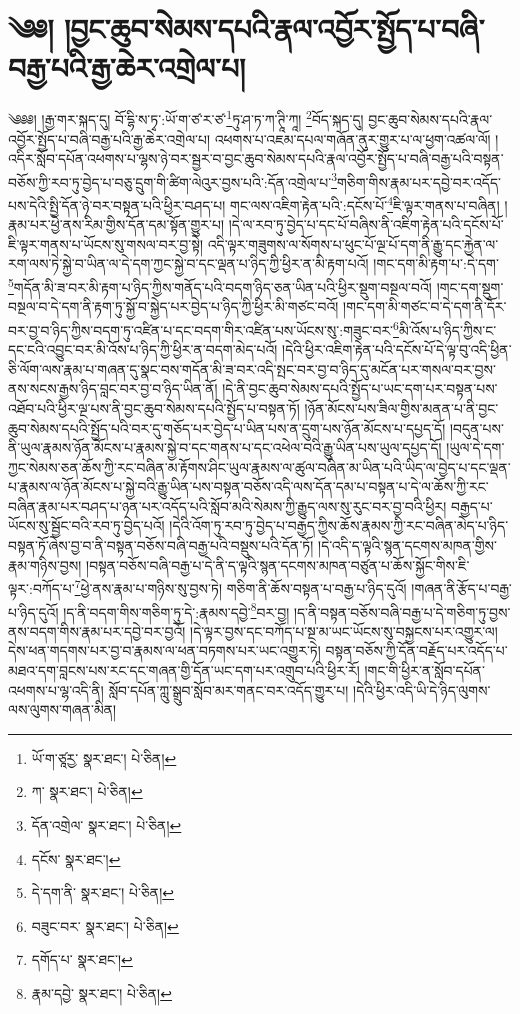 \setcounter{footnote}{0} 
\chapter{༄༅། །བྱང་ཆུབ་སེམས་དཔའི་རྣལ་འབྱོར་སྤྱོད་པ་བཞི་བརྒྱ་པའི་རྒྱ་ཆེར་འགྲེལ་པ།}༄༅༅། །རྒྱ་གར་སྐད་དུ། བོ་དྷི་ས་ཏྭ་:ཡོ་ག་ཙ་ར་ཙ་\footnote{ཡོ་ག་ཙཱརྱ་  སྣར་ཐང་།  པེ་ཅིན། }ཏུ་ཤ་ཏ་ཀ་ཊཱི་ཀཱ། \footnote{ཀ་  སྣར་ཐང་།  པེ་ཅིན། }བོད་སྐད་དུ། བྱང་ཆུབ་སེམས་དཔའི་རྣལ་འབྱོར་སྤྱོད་པ་བཞི་བརྒྱ་པའི་རྒྱ་ཆེར་འགྲེལ་པ། འཕགས་པ་འཇམ་དཔལ་གཞོན་ནུར་གྱུར་པ་ལ་ཕྱག་འཚལ་ལོ། །འདིར་སློབ་དཔོན་འཕགས་པ་ལྷས་ཉེ་བར་སྦྱར་བ་བྱང་ཆུབ་སེམས་དཔའི་རྣལ་འབྱོར་སྤྱོད་པ་བཞི་བརྒྱ་པའི་བསྟན་བཅོས་ཀྱི་རབ་ཏུ་བྱེད་པ་བཅུ་དྲུག་གི་ཚིག་ལེའུར་བྱས་པའི་:དོན་འགྲེལ་པ་\footnote{དོན་འགྲེལ་  སྣར་ཐང་།  པེ་ཅིན། }གཅིག་གིས་རྣམ་པར་དབྱེ་བར་འདོད་པས་དེའི་སྤྱི་དོན་ཉེ་བར་བསྟན་པའི་ཕྱིར་བཤད་པ། གང་ལས་འཇིག་རྟེན་པའི་:དངོས་པོ་\footnote{དངོས་  སྣར་ཐང་། }ཇི་ལྟར་གནས་པ་བཞིན། །རྣམ་པར་ཕྱེ་ནས་རིམ་གྱིས་དོན་དམ་སྟོན་གྱུར་པ། །དེ་ལ་རབ་ཏུ་བྱེད་པ་དང་པོ་བཞིས་ནི་འཇིག་རྟེན་པའི་དངོས་པོ་ཇི་ལྟར་གནས་པ་ཡོངས་སུ་གསལ་བར་བྱ་སྟེ། འདི་ལྟར་གཟུགས་ལ་སོགས་པ་ཕུང་པོ་ལྔ་པོ་དག་ནི་རྒྱུ་དང་རྐྱེན་ལ་རག་ལས་ཏེ་སྐྱེ་བ་ཡིན་ལ་དེ་དག་ཀྱང་སྐྱེ་བ་དང་ལྡན་པ་ཉིད་ཀྱི་ཕྱིར་ན་མི་རྟག་པའོ། །གང་དག་མི་རྟག་པ་:དེ་དག་\footnote{དེ་དག་ནི་  སྣར་ཐང་།  པེ་ཅིན། }གདོན་མི་ཟ་བར་མི་རྟག་པ་ཉིད་ཀྱིས་གནོད་པའི་བདག་ཉིད་ཅན་ཡིན་པའི་ཕྱིར་སྡུག་བསྔལ་བའོ། །གང་དག་སྡུག་བསྔལ་བ་དེ་དག་ནི་རྟག་ཏུ་སྐྱོ་བ་སྐྱེད་པར་བྱེད་པ་ཉིད་ཀྱི་ཕྱིར་མི་གཙང་བའོ། །གང་དག་མི་གཙང་བ་དེ་དག་ནི་དོར་བར་བྱ་བ་ཉིད་ཀྱིས་བདག་ཏུ་འཛིན་པ་དང་བདག་གིར་འཛིན་པས་ཡོངས་སུ་:གཟུང་བར་\footnote{བཟུང་བར་  སྣར་ཐང་།  པེ་ཅིན། }མི་འོས་པ་ཉིད་ཀྱིས་ང་དང་ངའི་འབྱུང་བར་མི་འོས་པ་ཉིད་ཀྱི་ཕྱིར་ན་བདག་མེད་པའོ། །དེའི་ཕྱིར་འཇིག་རྟེན་པའི་དངོས་པོ་དེ་ལྟ་བུ་འདི་ཕྱིན་ཅི་ལོག་ལས་རྣམ་པ་གཞན་དུ་སྣང་བས་གདོན་མི་ཟ་བར་འདི་སྤང་བར་བྱ་བ་ཉིད་དུ་མངོན་པར་གསལ་བར་བྱས་ནས་སངས་རྒྱས་ཉིད་བླང་བར་བྱ་བ་ཉིད་ཡིན་ནོ། །དེ་ནི་བྱང་ཆུབ་སེམས་དཔའི་སྤྱོད་པ་ཡང་དག་པར་བསྟན་པས་འཐོབ་པའི་ཕྱིར་ལྔ་པས་ནི་བྱང་ཆུབ་སེམས་དཔའི་སྤྱོད་པ་བསྟན་ཏོ། །ཉོན་མོངས་པས་ཟིལ་གྱིས་མནན་པ་ནི་བྱང་ཆུབ་སེམས་དཔའི་སྤྱོད་པའི་བར་དུ་གཅོད་པར་བྱེད་པ་ཡིན་པས་ན་དྲུག་པས་ཉོན་མོངས་པ་དཔྱད་དོ། །བདུན་པས་ནི་ཡུལ་རྣམས་ཉོན་མོངས་པ་རྣམས་སྐྱེ་བ་དང་གནས་པ་དང་འཕེལ་བའི་རྒྱུ་ཡིན་པས་ཡུལ་དཔྱད་དོ། །ཡུལ་དེ་དག་ཀྱང་སེམས་ཅན་ཆོས་ཀྱི་རང་བཞིན་མ་རྟོགས་ཤིང་ཡུལ་རྣམས་ལ་ཚུལ་བཞིན་མ་ཡིན་པའི་ཡིད་ལ་བྱེད་པ་དང་ལྡན་པ་རྣམས་ལ་ཉོན་མོངས་པ་སྐྱེ་བའི་རྒྱུ་ཡིན་པས་བསྟན་བཅོས་འདི་ལས་དོན་དམ་པ་བསྟན་པ་དེ་ལ་ཆོས་ཀྱི་རང་བཞིན་རྣམ་པར་བཤད་པ་ཉན་པར་འདོད་པའི་སློབ་མའི་སེམས་ཀྱི་རྒྱུད་ལས་སུ་རུང་བར་བྱ་བའི་ཕྱིར། བརྒྱད་པ་ཡོངས་སུ་སྦྱོང་བའི་རབ་ཏུ་བྱེད་པའོ། །དེའི་འོག་ཏུ་རབ་ཏུ་བྱེད་པ་བརྒྱད་ཀྱིས་ཆོས་རྣམས་ཀྱི་རང་བཞིན་མེད་པ་ཉིད་བསྟན་ཏོ་ཞེས་བྱ་བ་ནི་བསྟན་བཅོས་བཞི་བརྒྱ་པའི་བསྡུས་པའི་དོན་ཏོ། །དེ་འདི་ད་ལྟའི་སྙན་དངགས་མཁན་གྱིས་རྣམ་གཉིས་བྱས། །བསྟན་བཅོས་བཞི་བརྒྱ་པ་དེ་ནི་ད་ལྟའི་སྙན་དངགས་མཁན་བཙུན་པ་ཆོས་སྐྱོང་གིས་ཇི་ལྟར་:བཀོད་པ་\footnote{དགོད་པ་  སྣར་ཐང་། }ཕྱེ་ནས་རྣམ་པ་གཉིས་སུ་བྱས་ཏེ། གཅིག་ནི་ཆོས་བསྟན་པ་བརྒྱ་པ་ཉིད་དུའོ། །གཞན་ནི་རྩོད་པ་བརྒྱ་པ་ཉིད་དུའོ། །ད་ནི་བདག་གིས་གཅིག་ཏུ་དེ་:རྣམས་དབྱེ་\footnote{རྣམ་དབྱེ་  སྣར་ཐང་།  པེ་ཅིན། }བར་བྱ། །ད་ནི་བསྟན་བཅོས་བཞི་བརྒྱ་པ་དེ་གཅིག་ཏུ་བྱས་ནས་བདག་གིས་རྣམ་པར་དབྱེ་བར་བྱའོ། །དེ་ལྟར་བྱས་དང་བཀོད་པ་སྔ་མ་ཡང་ཡོངས་སུ་བསྐྱངས་པར་འགྱུར་ལ། དེས་ཕན་གདགས་པར་བྱ་བ་རྣམས་ལ་ཕན་བཏགས་པར་ཡང་འགྱུར་ཏེ། བསྟན་བཅོས་ཀྱི་དོན་བརྗོད་པར་འདོད་པ་མཐའ་དག་བླངས་པས་རང་དང་གཞན་གྱི་དོན་ཡང་དག་པར་འགྲུབ་པའི་ཕྱིར་རོ། །གང་གི་ཕྱིར་ན་སློབ་དཔོན་འཕགས་པ་ལྷ་འདི་ནི། སློབ་དཔོན་ཀླུ་སྒྲུབ་སློབ་མར་གནང་བར་འདོད་གྱུར་པ། །དེའི་ཕྱིར་འདི་ཡི་དེ་ཉིད་ལུགས་ལས་ལུགས་གཞན་མིན། 
